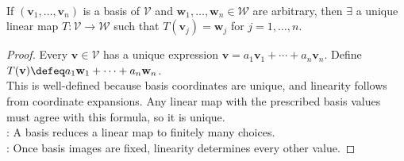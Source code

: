 \begin{proposition} \label{prop:linear-map-determined-by-basis} \\
If $(\mathbf{v}_1, \ldots, \mathbf{v}_n)$ is a basis of $\mathcal{V}$ and $\mathbf{w}_1, \ldots, \mathbf{w}_n \in \mathcal{W}$ are arbitrary, then $\exists$ a unique linear map $T : \mathcal{V} \to \mathcal{W}$ such that $T(\mathbf{v}_j) = \mathbf{w}_j$ for $j=1,\ldots,n$.
\begin{proof}
Every $\mathbf{v} \in \mathcal{V}$ has a unique expression $\mathbf{v} = a_1\mathbf{v}_1 + \cdots + a_n\mathbf{v}_n$. Define $T(\mathbf{v}) \defeq a_1\mathbf{w}_1 + \cdots + a_n\mathbf{w}_n$.\\
This is well-defined because basis coordinates are unique, and linearity follows from coordinate expansions. Any linear map with the prescribed basis values must agree with this formula, so it is unique.\\
: A basis reduces a linear map to finitely many choices.\\
: Once basis images are fixed, linearity determines every other value.
\end{proof}
\end{proposition}

